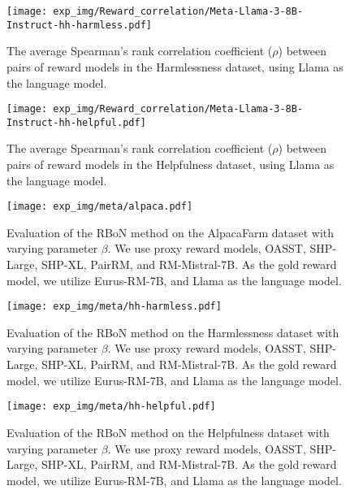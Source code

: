 \begin{figure}[htbp]
    \centering
    \texttt{[image: exp\_img/Reward\_correlation/Meta-Llama-3-8B-Instruct-hh-harmless.pdf]}
    \caption{
    The average Spearman's rank correlation coefficient ($\rho$) between pairs of reward models in the Harmlessness dataset, using Llama as the language model.
    }
    \label{fig:rec_meta_ha}
\end{figure}

\begin{figure}[htbp]
    \centering
    \texttt{[image: exp\_img/Reward\_correlation/Meta-Llama-3-8B-Instruct-hh-helpful.pdf]}
    \caption{
    The average Spearman's rank correlation coefficient ($\rho$) between pairs of reward models in the Helpfulness dataset, using Llama as the language model.
    }
    \label{fig:rec_meta_he}
\end{figure}



\begin{figure}[htbp]
    \centering
    \texttt{[image: exp\_img/meta/alpaca.pdf]}
    \caption{
    Evaluation of the RBoN method on the AlpacaFarm dataset with varying parameter $\beta$. We use proxy reward models, OASST, SHP-Large, SHP-XL,  PairRM, and RM-Mistral-7B. As the gold reward model, we utilize Eurus-RM-7B, and Llama as the language model.
    }
    \label{fig:meta-a}
\end{figure}

\begin{figure}[htbp]
    \centering
    \texttt{[image: exp\_img/meta/hh-harmless.pdf]}
    \caption{
    Evaluation of the RBoN method on the Harmlessness dataset with varying parameter $\beta$. We use proxy reward models, OASST, SHP-Large, SHP-XL,  PairRM, and RM-Mistral-7B. As the gold reward model, we utilize Eurus-RM-7B, and Llama as the language model.
    }
    \label{fig:meta-ha}
\end{figure}

\begin{figure}[htbp]
    \centering
    \texttt{[image: exp\_img/meta/hh-helpful.pdf]}
    \caption{
    Evaluation of the RBoN method on the Helpfulness dataset with varying parameter $\beta$. We use proxy reward models, OASST, SHP-Large, SHP-XL,  PairRM, and RM-Mistral-7B. As the gold reward model, we utilize Eurus-RM-7B, and Llama as the language model.
    }
    \label{fig:meta-he}
\end{figure}


